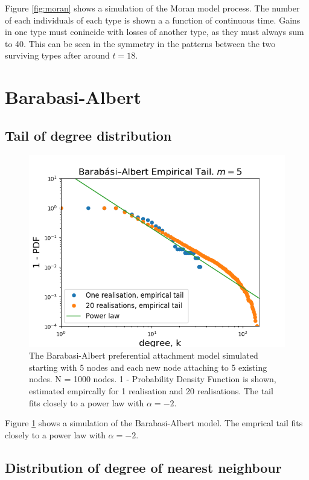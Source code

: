 \documentclass{article}
\begin{document}
Figure \ref{fig:moran} shows a simulation of the Moran model process. The number of each individuals of each type is shown a a function of continuous time. Gains in one type must conincide with losses of another type, as they must always sum to 40. This can be seen in the symmetry in the patterns between the two surviving types after around $t=18$.

\section{Barabasi-Albert}

\subsection{Tail of degree distribution}

\begin{figure}[H]
\includegraphics[scale=0.8]{barabasi_a.png} 
\caption{The Barabasi-Albert preferential attachment model simulated starting with 5 nodes and each new node attaching to 5 existing nodes. N = 1000 nodes. 1 - Probability Density Function is shown, estimated empircally for 1 realisation and 20 realisations. The tail fits closely to a power law with $\alpha=-2$.} 
\label{fig:barabasi}
\end{figure}

Figure \ref{fig:barabasi} shows a simulation of the Barabasi-Albert model. The emprical tail fits closely to a power law with $\alpha = -2$.

\subsection{Distribution of degree of nearest neighbour}
\end{document}
